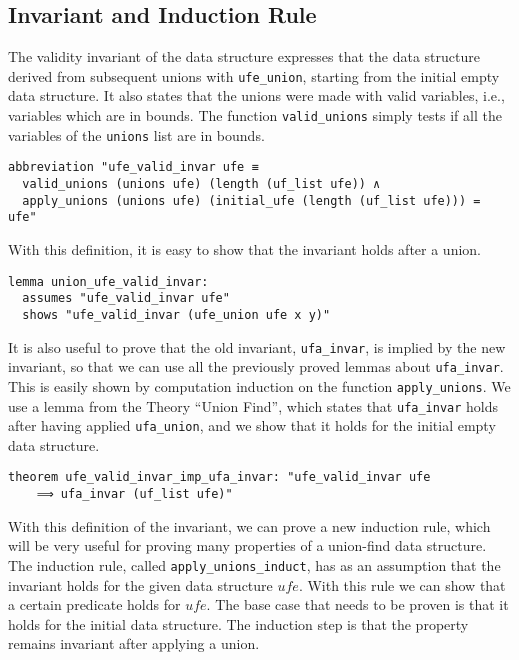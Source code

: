 \subsection{Invariant and Induction Rule}

The validity invariant of the data structure expresses that the data structure derived from subsequent unions with \lstinline{ufe_union}, starting from the initial empty data structure.
It also states that the unions were made with valid variables, i.e., variables which are in bounds.
The function \lstinline|valid_unions| simply tests if all the variables of the \lstinline|unions| list are in bounds.

\begin{lstlisting}
abbreviation "ufe_valid_invar ufe ≡
  valid_unions (unions ufe) (length (uf_list ufe)) ∧
  apply_unions (unions ufe) (initial_ufe (length (uf_list ufe))) = ufe"
\end{lstlisting}

With this definition, it is easy to show that the invariant holds after a union.

\begin{lstlisting}
lemma union_ufe_valid_invar:
  assumes "ufe_valid_invar ufe"
  shows "ufe_valid_invar (ufe_union ufe x y)"
\end{lstlisting}

It is also useful to prove that the old invariant, \lstinline{ufa_invar}, is implied by the new invariant, so that we can use all the previously proved lemmas about \lstinline{ufa_invar}. This is easily shown by computation induction on the function \lstinline{apply_unions}. We use a lemma from the Theory ``Union Find'', which states that \lstinline{ufa_invar} holds after having applied \lstinline{ufa_union}, and we show that it holds for the initial empty data structure.

\begin{lstlisting}
theorem ufe_valid_invar_imp_ufa_invar: "ufe_valid_invar ufe
    ⟹ ufa_invar (uf_list ufe)"
\end{lstlisting}

With this definition of the invariant, we can prove a new induction rule, which will be very useful for proving many properties of a union-find data structure. The induction rule, called \lstinline{apply_unions_induct}, has as an assumption that the invariant holds for the given data structure $ufe$. With this rule we can show that a certain predicate holds for $ufe$. The base case that needs to be proven is that it holds for the initial data structure. The induction step is that the property remains invariant after applying a union.


